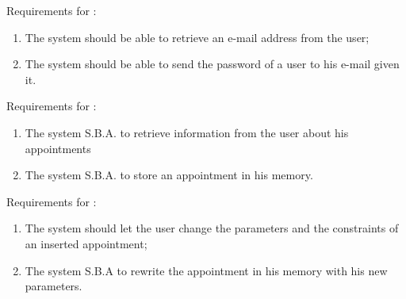 Requirements for :
\begin{enumerate}[resume]
\renewcommand\labelenumi{\textbf{R\theenumi}}
\item The system should be able to retrieve an e-mail address from the user; \label{req:R6}
\item The system should be able to send the password of a user to his e-mail given it. \label{req:R7}
\end{enumerate}

Requirements for :
\begin{enumerate}[resume]
\renewcommand\labelenumi{\textbf{R\theenumi}}
\item The system S.B.A. to retrieve information from the user about his appointments \label{req:R8}
\item The system S.B.A. to store an appointment in his memory. \label{req:R9}
\end{enumerate}

Requirements for :
\begin{enumerate}[resume]
\renewcommand\labelenumi{\textbf{R\theenumi}}
\item The system should let the user change the parameters and the constraints of an inserted appointment; \label{req:R10}
\item The system S.B.A to rewrite the appointment in his memory with his new parameters. \label{req:R11}
\end{enumerate}

